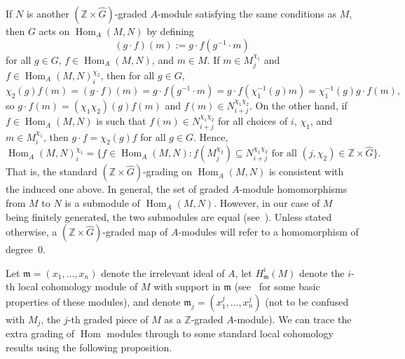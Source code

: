 \documentclass[10pt]{amsart}
\theoremstyle{definition}
\DeclareMathOperator{\Hom}{Hom}
\newcommand{\ZZ}{{\mathbb Z}}
\newcommand{\mideal}{\ensuremath{\mathfrak{m}}}
\begin{document}
If $N$ is another $(\ZZ\times \hat{G})$-graded $A$-module satisfying the same conditions as $M$, then $G$ acts on $\Hom_A(M, N)$ by defining
\[
(g\cdot f)(m):=g\cdot f(g^{-1}\cdot m)
\]
for all $g\in G$, $f\in \Hom_A(M, N)$, and $m\in M$. If $m\in M_j^{\chi_1}$ and $f\in \Hom_A(M, N)_i^{\chi_2}$, then for all $g\in G$,
\[
\chi_2(g) f(m)=(g\cdot f)(m)=g\cdot f(g^{-1}\cdot m)=g\cdot f(\chi_1^{-1}(g)m)=\chi_1^{-1}(g)g\cdot f(m),
\]
so $g\cdot f(m)=(\chi_1\chi_2)(g)f(m)$ and $f(m)\in N_{i+j}^{\chi_1\chi_2}$. On the other hand, if $f\in \Hom_A(M, N)$ is such that $f(m)\in N_{i+j}^{\chi_1\chi_2}$ for all choices of $i$, $\chi_1$, and $m\in M_i^{\chi_1}$, then $g\cdot f=\chi_2(g) f$ for all $g\in G$. Hence,
\[
\Hom_A(M, N)_i^{\chi_1}=\{f\in\Hom_A(M, N): f(M_j^{\chi_2})\subseteq N_{i+j}^{\chi_1\chi_2}\text{ for all }(j,\chi_2)\in\ZZ\times \hat{G}\}.
\]
That is, the standard $(\ZZ\times \hat{G})$-grading on $\Hom_A(M, N)$ is consistent with the induced one above. In general, the set of graded $A$-module homomorphisms from $M$ to $N$ is a submodule of $\Hom_A(M, N)$. However, in our case of $M$ being finitely generated, the two submodules are equal (see~\cite[Section~II.11.6]{Bourbaki}). Unless stated otherwise, a $(\ZZ\times\hat{G})$-graded map of $A$-modules will refer to a homomorphism of degree~$0$.

Let $\mideal=(x_1, \ldots, x_n)$ denote the irrelevant ideal of $A$, let $H_\mideal^i(M)$ denote the $i$-th local cohomology module of $M$ with support in $\mideal$ (see~\cite{24Hours} for some basic properties of these modules), and denote $\mideal_j=(x_1^j, \ldots, x_n^j)$ (not to be confused with $M_j$, the $j$-th graded piece of $M$ as a $\ZZ$-graded $A$-module). We can trace the extra grading of $\Hom$ modules through to some standard local cohomology results using the following proposition.
\end{document}
